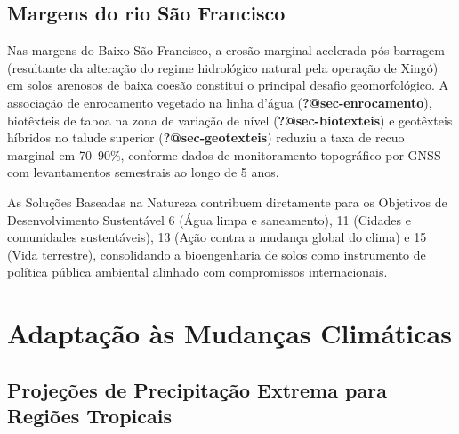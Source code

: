 \documentclass[
  portuguese,
  11pt,
  a4paper,
  open=any]{scrbook}
\begin{document}
\subsection{Margens do rio São
Francisco}\label{margens-do-rio-suxe3o-francisco}

Nas margens do Baixo São Francisco, a erosão marginal acelerada
pós-barragem (resultante da alteração do regime hidrológico natural pela
operação de Xingó) em solos arenosos de baixa coesão constitui o
principal desafio geomorfológico. A associação de enrocamento vegetado
na linha d'água (\textbf{?@sec-enrocamento}), biotêxteis de taboa na
zona de variação de nível (\textbf{?@sec-biotexteis}) e geotêxteis
híbridos no talude superior (\textbf{?@sec-geotexteis}) reduziu a taxa
de recuo marginal em 70--90\%, conforme dados de monitoramento
topográfico por GNSS com levantamentos semestrais ao longo de 5 anos.

\begin{tcolorbox}[enhanced jigsaw, leftrule=.75mm, colframe=quarto-callout-note-color-frame, colback=white, bottomrule=.15mm, opacityback=0, colbacktitle=quarto-callout-note-color!10!white, breakable, bottomtitle=1mm, opacitybacktitle=0.6, title=\textcolor{quarto-callout-note-color}{\faInfo}\hspace{0.5em}{NBS e ODS}, titlerule=0mm, toprule=.15mm, toptitle=1mm, rightrule=.15mm, left=2mm, arc=.35mm, coltitle=black]

As Soluções Baseadas na Natureza contribuem diretamente para os
Objetivos de Desenvolvimento Sustentável 6 (Água limpa e saneamento), 11
(Cidades e comunidades sustentáveis), 13 (Ação contra a mudança global
do clima) e 15 (Vida terrestre), consolidando a bioengenharia de solos
como instrumento de política pública ambiental alinhado com compromissos
internacionais.

\end{tcolorbox}

\section{Adaptação às Mudanças
Climáticas}\label{adaptauxe7uxe3o-uxe0s-mudanuxe7as-climuxe1ticas}

\subsection{Projeções de Precipitação Extrema para Regiões
Tropicais}\label{projeuxe7uxf5es-de-precipitauxe7uxe3o-extrema-para-regiuxf5es-tropicais}
\end{document}
